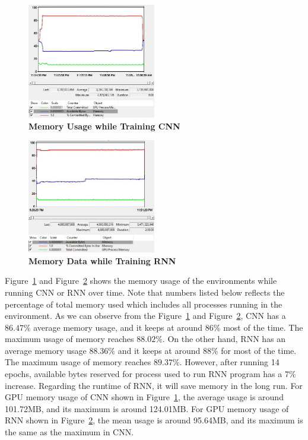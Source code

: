 \documentclass[letterpaper]{article} %
\begin{document}
	\begin{figure}[h!]
		\centering
		\includegraphics[width=0.5\textwidth]{CNN_Memory_Data.jpg}
		\caption{\textbf{Memory Usage while Training CNN}}
		\label{fig:cnn_mem}
	\end{figure}
	\begin{figure}[h!]
		\centering
		\includegraphics[width=0.5\textwidth]{RNN_Memory_Data.jpg}
		\caption{\textbf{Memory Data while Training RNN}}
		\label{fig:rnn_mem}
	\end{figure}
	
	Figure~\ref{fig:cnn_mem} and Figure~\ref{fig:rnn_mem} shows the memory usage of the environments while running CNN or RNN over time. Note that numbers listed below reflects the percentage of total memory used which includes all processes running in the environment. As we can observe from the Figure~\ref{fig:cnn_mem} and Figure~\ref{fig:rnn_mem}, CNN has a $86.47\%$ average memory usage, and it keeps at around $86\%$ most of the time. The maximum usage of memory reaches $88.02\%$. On the other hand, RNN has an average memory usage $88.36\%$ and it keeps at around $88\%$ for most of the time. The maximum usage of memory reaches $89.37\%$. However, after running 14 epochs, available bytes reserved for process used to run RNN program has a $7\%$ increase. Regarding the runtime of RNN, it will save memory in the long run. For GPU memory usage of CNN shown in Figure~\ref{fig:cnn_mem}, the average usage is around 101.72MB, and its maximum is around 124.01MB. For GPU memory usage of RNN shown in Figure~\ref{fig:rnn_mem}, the mean usage is around 95.64MB, and its maximum is the same as the maximum in CNN.
	
\end{document}
